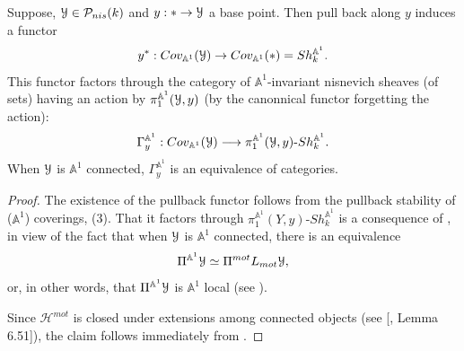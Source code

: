 \begin{prop}
Suppose, $\EuScript{Y}\in \mathcal{P}_{nis}(k)$ and $y:*\to \EuScript{Y}$ a base point. Then pull back along $y$ induces a functor $$y^*:Cov_{\mathbb{A}^1}(\EuScript{{Y}})\to Cov_{\mathbb{A}^1}(*)=Sh^{\mathbb{A}^1}_k.$$ This functor factors through the category of $\mathbb{A}^1$-invariant nisnevich sheaves (of sets) having an action by $\pi_1^{\mathbb{A}^1}(\EuScript{Y},y)$ (by the canonnical functor forgetting the action): $$\Gamma_y^{\mathbb{A}^1}:Cov_{\mathbb{A}^1}(\EuScript{{Y}})\longrightarrow \pi_1^{\mathbb{A}^1}(\EuScript{Y},y)\mbox{-}Sh^{\mathbb{A}^1}_k.$$
When $\EuScript{Y}$ is $\mathbb{A}^1$ connected, $\Gamma_y^{\mathbb{A}^1}$ is an equivalence of categories.
\end{prop}
\begin{proof}
The existence of the pullback functor follows from the pullback stability of ($\mathbb{A}^1$) coverings,  (3). That it factors through $\pi_1^{\mathbb{A}^1}(Y,y)\mbox{-}Sh^{\mathbb{A}^1}_k$ is a consequence of , in view of the fact that when $\EuScript{Y}$ is $\mathbb{A}^1$ connected, there is an equivalence $$\Pi^{\mathbb{A}^1}\EuScript{Y}\simeq \Pi^{mot}L_{mot}\EuScript{Y},$$ or, in other words, that $\Pi^{\mathbb{A}^1}\EuScript{Y}$ is $\mathbb{A}^1$ local (see ).

Since $\mathcal{H}^{mot}$ is closed under extensions among connected objects (see [\cite{morel2012a1}, Lemma 6.51]), the claim follows immediately from .
\end{proof}

